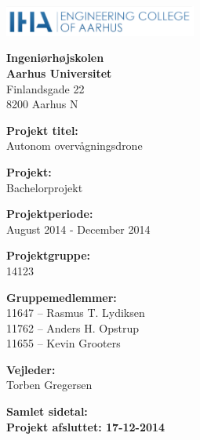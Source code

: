 \newpage

{}


\begin{minipage}[t]{0.48\textwidth}
\vspace*{14pt}			%
\vspace{1.2cm}
\includegraphics[height=1cm]{billeder/iha-logo.png} 
\end{minipage}
\hfill

\vspace*{1cm}

\begin{minipage}[t]{0.48\textwidth}

{\small 
\flushleft
\textbf{Ingeniørhøjskolen}\\
\textbf{Aarhus Universitet}  \\
Finlandsgade 22 \\
8200 Aarhus N \\
}

\vspace*{1cm}

\textbf{Projekt titel:} \\[5pt]\bigskip\hspace{2ex}
Autonom overvågningsdrone

\textbf{Projekt:} \\[5pt]\bigskip\hspace{2ex}
Bachelorprojekt

\textbf{Projektperiode:} \\[5pt]\bigskip\hspace{2ex}
August 2014 - December 2014

\textbf{Projektgruppe:} \\[5pt]\bigskip\hspace{2ex}
14123

\textbf{Gruppemedlemmer:} \\[5pt]\hspace*{2ex}
11647 -- Rasmus T. Lydiksen \\\hspace*{2ex}
11762 -- Anders H. Opstrup \\\bigskip\hspace*{2ex}
11655 -- Kevin Grooters \\\bigskip\hspace*{2ex}


\textbf{Vejleder:} \\[5pt]\hspace*{2ex}
Torben Gregersen \\\bigskip\hspace{2ex}

\vspace*{1cm}

\textbf{Samlet sidetal: \pageref{LastPage}} \\
\textbf{Projekt afsluttet: 17-12-2014}


\end{minipage}
\hfill
\vfill

